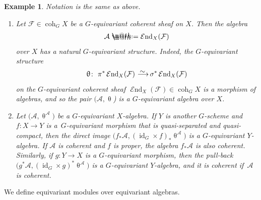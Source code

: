 \documentclass[11pt]{article}
\makeatletter
\numberwithin{equation}{section}
\newtheorem{exa}[dfn]{Example}
\newcommand*{\defeq}{\mathrel{\rlap{%
 \raisebox{0.3ex}{$\m@th\cdot$}}%
 \raisebox{-0.3ex}{$\m@th\cdot$}}%
 =}
\numberwithin{equation}{section}
\newcommand{\cEnd}{\operatorname{{\mathcal E}nd}}
\newcommand{\coh}{\operatorname{coh}}
\newcommand{\id}{\operatorname{id}}
\newcommand{\cA}{\mathcal{A}}
\newcommand{\cF}{\mathcal{F}}
\newcommand{\simto}{\,\,\,\,\raisebox{4pt}{$\sim$}{\kern -1.1em \longrightarrow}\,}
\makeatother
\begin{document}
\begin{exa}\label{end ex}
Notation is the same as above.
\begin{enumerate}\itemsep=0pt
\item Let $\cF\in \coh_GX$ be a $G$-equivariant coherent sheaf on $X$. Then the algebra
\begin{gather*}
\cA\defeq\cEnd_X(\cF)
\end{gather*}
over $X$ has a natural $G$-equivariant structure. Indeed, the $G$-equivariant structure
\begin{gather*}
\uptheta\colon\ \pi^*\cEnd_X(\cF)\simto \sigma^*\cEnd_X(\cF)
\end{gather*}
on the $G$-equivariant coherent sheaf $\cEnd_X(\cF)\in\coh_GX$
is a morphism of algebras, and so the pair $(\cA, \uptheta$) is a $G$-equivariant algebra over $X$.


\item Let $\big(\cA,\uptheta^{\cA}\big)$ be a $G$-equivariant $X$-algebra. If $Y$ is another $G$-scheme and $f\colon X\to Y$ is a~$G$-equ\-i\-variant morphism that is quasi-separated and quasi-compact,
then the direct image
$\big(f_*\cA,(\id_G\times f)_*\uptheta^{\cA}\big)$
is a $G$-equivariant $Y$-algebra. If $\cA$ is coherent and $f$ is proper, the algebra $f_*\cA$ is also coherent. Similarly, if $g\colon Y\to X$ is a $G$-equivariant morphism, then the pull-back $\big(g^*\cA,(\id_G\times g)^*\uptheta^{\cA}\big)$ is a $G$-equivariant $Y$-algebra, and it is coherent if~$\cA$ is coherent.
 \end{enumerate}
\end{exa}



We define equivariant modules over equivariant algebras.
\end{document}
